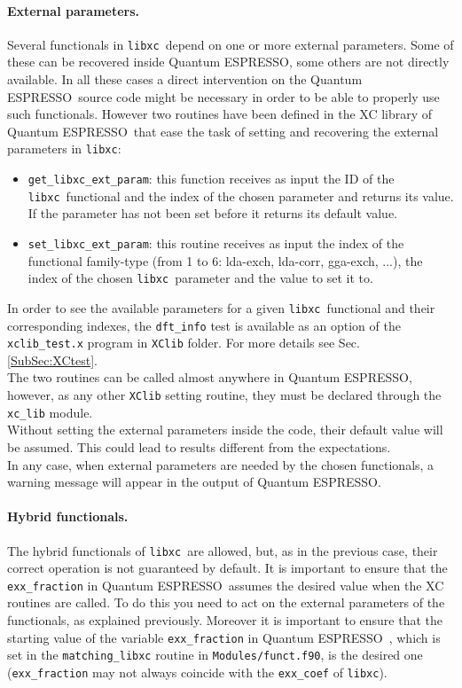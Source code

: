 \documentclass[12pt,a4paper]{article}
\def\qe{{\sc Quantum ESPRESSO}}
\def\libxc{\texttt{libxc}}
\begin{document}
\paragraph{External parameters.}
Several functionals in \libxc\ depend on one or more external parameters. Some of these can be recovered inside \qe, some others are not directly available. In all these cases a direct intervention on the \qe\ source code might be necessary in order to be able to properly use such functionals. However two routines have been defined in the XC library of \qe\ that ease the task of setting and recovering the external parameters in \libxc:
\begin{itemize}
	\item \texttt{get\_libxc\_ext\_param}: this function receives as input the ID of the \libxc\ functional and the index of the chosen parameter and returns its value. If the parameter has not been set before it returns its default value.
	\item \texttt{set\_libxc\_ext\_param}: this routine receives as input the index of the functional family-type (from 1 to 6: lda-exch, lda-corr, gga-exch, ...), the index of the chosen \libxc\ parameter and the value to set it to.
\end{itemize}
In order to see the available parameters for a given \libxc\ functional and their corresponding indexes, the \texttt{dft\_info} test is available as an option of the \texttt{xclib\_test.x} program in \texttt{XClib} folder. For more details see Sec. \ref{SubSec:XCtest}.\\
The two routines can be called almost anywhere in \qe, however, as any other \texttt{XClib} setting routine, they must be declared through the \texttt{xc\_lib} module.\\
Without setting the external parameters inside the code, their default value will be assumed. This could lead to results different from the expectations.\\
In any case, when external parameters are needed by the chosen functionals, a warning message will appear in the output of \qe.
%
\paragraph{Hybrid functionals.} The hybrid functionals of \libxc\ are allowed, but, as in the previous case, their correct operation is not guaranteed by default. It is important to ensure that the \texttt{exx\_fraction} in \qe\ assumes the desired value when the XC routines are called. To do this you need to act on the external parameters of the functionals, as explained previously. Moreover it is important to ensure that the starting value of the variable \texttt{exx\_fraction} in \qe\ , which is set in the \texttt{matching\_libxc} routine in \texttt{Modules/funct.f90}, is the desired one (\texttt{exx\_fraction} may not always coincide with the \texttt{exx\_coef} of \libxc).
%
\end{document}
